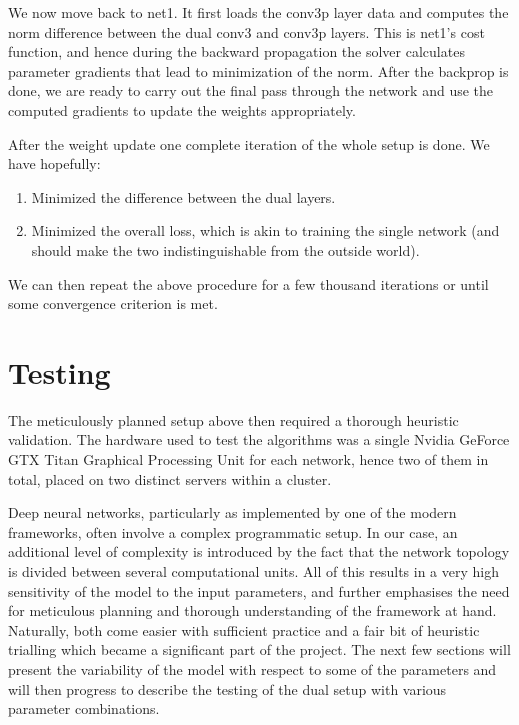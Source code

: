 \documentclass[a4paper, 12pt]{article}
\numberwithin{equation}{section}
\begin{document}
	We now move back to net1. It first loads the conv3p layer data and computes the norm difference between the dual conv3 and conv3p layers. This is net1's cost function, and hence during the backward propagation the solver calculates parameter gradients that lead to minimization of the norm. After the backprop is done, we are ready to carry out the final pass through the network and use the computed gradients to update the weights appropriately.
	
	After the weight update one complete iteration of the whole setup is done. We have hopefully:
	
	\begin{enumerate}
		\item Minimized the difference between the dual layers.
		\item Minimized the overall loss, which is akin to training the single network (and should make the two indistinguishable from the outside world).
	\end{enumerate}
	
	We can then repeat the above procedure for a few thousand iterations or until some convergence criterion is met.
	
	\section{Testing}
	
	The meticulously planned setup above then required a thorough heuristic validation. The hardware used to test the algorithms was a single Nvidia GeForce GTX Titan Graphical Processing Unit for each network, hence two of them in total, placed on two distinct servers within a cluster.
	
	Deep neural networks, particularly as implemented by one of the modern frameworks, often involve a complex programmatic setup. In our case, an additional level of complexity is introduced by the fact that the network topology is divided between several computational units. All of this results in a very high sensitivity of the model to the input parameters, and further emphasises the need for meticulous planning and thorough understanding of the framework at hand. Naturally, both come easier with sufficient practice and a fair bit of heuristic trialling which became a significant part of the project. The next few sections will present the variability of the model with respect to some of the parameters and will then progress to describe the testing of the dual setup with various parameter combinations.
	
\end{document}
